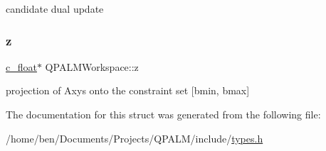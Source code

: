 candidate dual update 

\mbox{\label{structQPALMWorkspace_a38524247b44059e6989761d6a9159b0a}} 
\subsubsection{\texorpdfstring{z}{z}}
{\footnotesize\ttfamily \mbox{\hyperlink{global__opts_8h_a7f1a9fda95e52979658c20a0d134fb15}{c\+\_\+float}}$\ast$ Q\+P\+A\+L\+M\+Workspace\+::z}



projection of Axys onto the constraint set \mbox{[}bmin, bmax\mbox{]} 



The documentation for this struct was generated from the following file\+:\begin{DoxyCompactItemize}
\item 
/home/ben/\+Documents/\+Projects/\+Q\+P\+A\+L\+M/include/\mbox{\hyperlink{types_8h}{types.\+h}}\end{DoxyCompactItemize}
